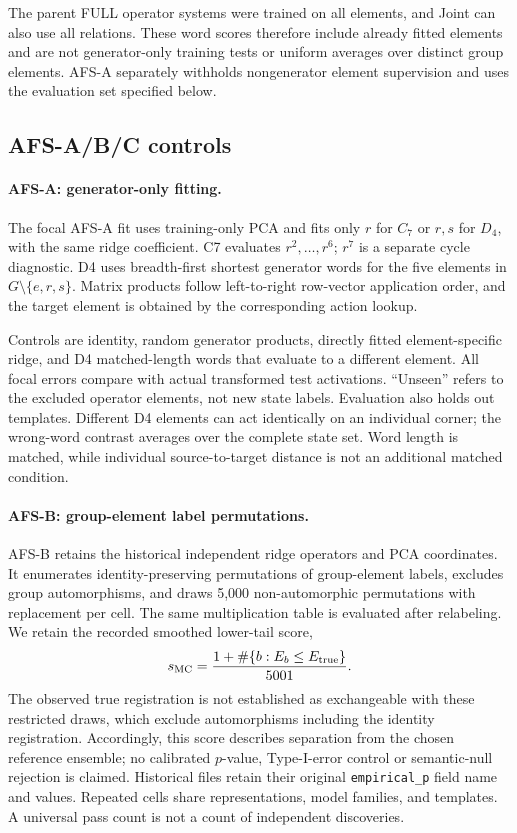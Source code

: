 The parent FULL operator systems were trained on all elements,
and Joint can also use all relations.
These word scores therefore include already fitted elements
and are not generator-only training tests or uniform averages
over distinct group elements.
AFS-A separately withholds nongenerator element supervision
and uses the evaluation set specified below.

\subsection{AFS-A/B/C controls}

\paragraph{AFS-A: generator-only fitting.}
The focal AFS-A fit uses training-only PCA and fits only $r$
for $C_7$ or $r,s$ for $D_4$, with the same ridge coefficient.
C7 evaluates $r^2,\ldots,r^6$;
$r^7$ is a separate cycle diagnostic.
D4 uses breadth-first shortest generator words for the five
elements in $G\setminus\{e,r,s\}$.
Matrix products follow left-to-right row-vector application
order, and the target element is obtained by the corresponding
action lookup.

Controls are identity, random generator products,
directly fitted element-specific ridge, and D4 matched-length
words that evaluate to a different element.
All focal errors compare with actual transformed test
activations.
``Unseen'' refers to the excluded operator elements,
not new state labels.
Evaluation also holds out templates.
Different D4 elements can act identically on an individual
corner; the wrong-word contrast averages over the complete
state set.
Word length is matched, while individual source-to-target
distance is not an additional matched condition.

\paragraph{AFS-B: group-element label permutations.}
AFS-B retains the historical independent ridge operators and
PCA coordinates.
It enumerates identity-preserving permutations of
group-element labels, excludes group automorphisms,
and draws 5,000 non-automorphic permutations with replacement
per cell.
The same multiplication table is evaluated after relabeling.
We retain the recorded smoothed lower-tail score,
\[
 s_{\rm MC}
 =
 \frac{1+\#\{b:E_b\le E_{\rm true}\}}{5001}.
\]
The observed true registration is not established as
exchangeable with these restricted draws, which exclude
automorphisms including the identity registration.
Accordingly, this score describes separation from the chosen
reference ensemble; no calibrated $p$-value, Type-I-error
control or semantic-null rejection is claimed.
Historical files retain their original
\texttt{empirical\_p} field name and values.
Repeated cells share representations, model families,
and templates.
A universal pass count is not a count of independent discoveries.

